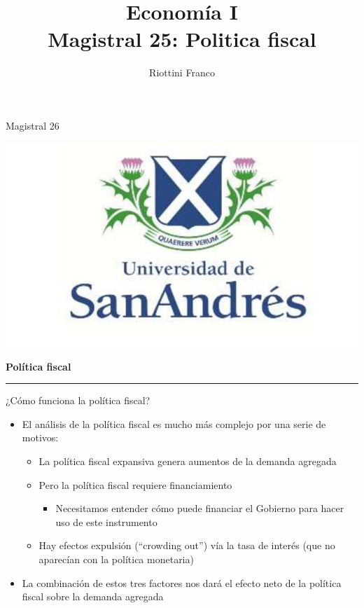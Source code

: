 \documentclass{beamer}
\title[Economía I]{Economía I \vspace{4mm}
\\ Magistral 25: Politica fiscal}
\date{}
\author[Riottini]{Riottini Franco}
\institute[]{Universidad de San Andrés}
\begin{document}
\begin{frame}
\titlepage
\centering
Magistral 26

\includegraphics[scale=0.2]{../Figures/logoUDESA.jpg} 
\end{frame}

\begin{frame}{}
\centering 	\huge \textbf{Política fiscal} 
\vspace{2mm}
\hrule
\end{frame}


\begin{frame}{¿Cómo funciona la política fiscal?}
    \begin{itemize}
        \item El análisis de la política fiscal es mucho más complejo por una serie de motivos:
        \begin{itemize}
            \item La política fiscal expansiva genera aumentos de la demanda agregada 
            \item Pero la política fiscal requiere financiamiento
            \begin{itemize}
                \item Necesitamos entender cómo puede financiar el Gobierno para hacer uso de este instrumento
            \end{itemize}
            \item Hay efectos expulsión (“crowding out”) vía la tasa de interés (que no aparecían con la política monetaria)
        \end{itemize}
        \vspace{2mm}
        \item La combinación de estos tres factores nos dará el efecto neto de la política fiscal sobre la demanda agregada
    \end{itemize}
\end{frame}
\end{document}
